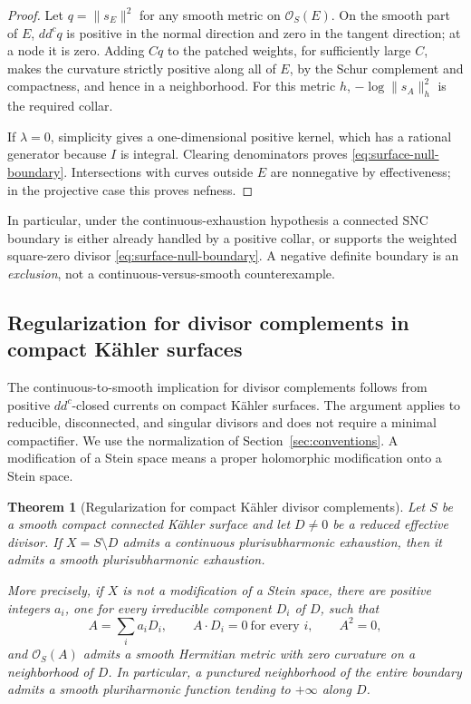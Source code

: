 \documentclass[11pt]{amsart}
\newtheorem{theorem}{Theorem}[section]
\theoremstyle{definition}
\theoremstyle{remark}
\numberwithin{equation}{section}
\newcommand{\OO}{\mathcal O}
\newcommand{\ddc}{dd^c}
\begin{document}
\begin{proof}
Let $q=\|s_E\|^2$ for any smooth metric on $\OO_S(E)$. On the smooth
part of $E$, $\ddc q$ is positive in the normal direction and zero
in the tangent direction; at a node it is zero. Adding $Cq$ to the
patched weights, for sufficiently large $C$, makes the curvature
strictly positive along all of $E$, by the Schur complement and
compactness, and hence in a neighborhood. For this metric $h$,
$-\log\|s_A\|_h^2$ is the required collar.

If $\lambda=0$, simplicity gives a one-dimensional positive kernel,
which has a rational generator because $I$ is integral. Clearing
denominators proves \eqref{eq:surface-null-boundary}. Intersections
with curves outside $E$ are nonnegative by effectiveness; in the
projective case this proves nefness.
\end{proof}

In particular, under the continuous-exhaustion hypothesis a connected
SNC boundary is either already handled by a positive collar, or
supports the weighted square-zero divisor
\eqref{eq:surface-null-boundary}. A negative definite boundary is an
\emph{exclusion}, not a continuous-versus-smooth counterexample.

\subsection{Regularization for divisor complements in compact K\"ahler surfaces}
\label{subsec:divisor-regularization}
The continuous-to-smooth implication for divisor complements follows
from positive $dd^c$-closed currents on compact K\"ahler surfaces.
The argument applies to reducible, disconnected, and singular divisors
and does not require a minimal compactifier. We use the normalization
of Section~\ref{sec:conventions}. A modification of a Stein space
means a proper holomorphic modification onto a Stein space.

\begin{theorem}[Regularization for compact K\"ahler divisor complements]
\label{thm:divisor-regularization}
Let $S$ be a smooth compact connected K\"ahler surface and let
$D\ne0$ be a reduced effective divisor.  If $X=S\setminus D$ admits
a continuous plurisubharmonic exhaustion, then it admits a smooth
plurisubharmonic exhaustion.

More precisely, if $X$ is not a modification of a Stein space, there
are positive integers $a_i$, one for every irreducible component $D_i$
of $D$, such that
\[
 A=\sum_i a_iD_i,\qquad A\cdot D_i=0\ \text{for every }i,
 \qquad A^2=0,
\]
and $\mathcal O_S(A)$ admits a smooth Hermitian metric with zero
curvature on a neighborhood of $D$.  In particular, a punctured
neighborhood of the entire boundary admits a smooth pluriharmonic
function tending to $+\infty$ along $D$.
\end{theorem}
\end{document}
